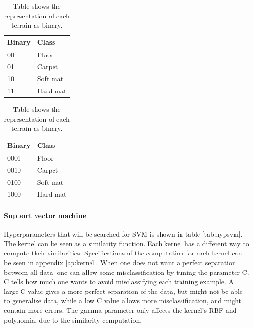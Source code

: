 \documentclass[USenglish]{ifimaster}  %
\begin{document}
\begin{table}[h]
	\begin{subtable}[h]{0.5\textwidth}
		\centering
		\captionsetup{justification=centering}
		\begin{tabular}{@{}ll@{}}
		\toprule
		\textbf{Binary} & \textbf{Class} \\ \midrule
		00 & Floor \\
		01 & Carpet \\
		10 & Soft mat \\
		11 & Hard mat \\ \bottomrule
	\end{tabular}
		\caption{Table shows the two binary digits representation of each terrain.}
		\label{tab:twobin}
	\end{subtable}
	\hfill
	\begin{subtable}[h]{0.5\textwidth}
		\centering
		\captionsetup{justification=centering}
	\begin{tabular}{@{}ll@{}}
	\toprule
	\textbf{Binary} & \textbf{Class} \\ \midrule
	0001 & Floor \\
	0010 & Carpet \\
	0100 & Soft mat \\
	1000 & Hard mat \\ \bottomrule
\end{tabular}
		\caption{Table shows the four binary digits representation of each terrain.}
		\label{tab:fourbin}
	\end{subtable}
	\caption{Table shows the representation of each terrain as binary.}
	\label{tab:binary}
\end{table}
\FloatBarrier


\paragraph{Support vector machine}
Hyperparameters that will be searched for SVM is shown in table \ref{tab:hypsvm}. The kernel can be seen as a similarity function. Each kernel has a different way to compute their similarities. Specifications of the computation for each kernel can be seen in appendix \ref{ap:kernel}. When one does not want a perfect separation between all data, one can allow some misclassification by tuning the parameter C. C tells how much one wants to avoid misclassifying each training example. A large C value gives a more perfect separation of the data, but might not be able to generalize data, while a low C value allows more misclassification, and might contain more errors. The gamma parameter only affects the kernel’s RBF and polynomial due to the similarity computation.
\end{document}
